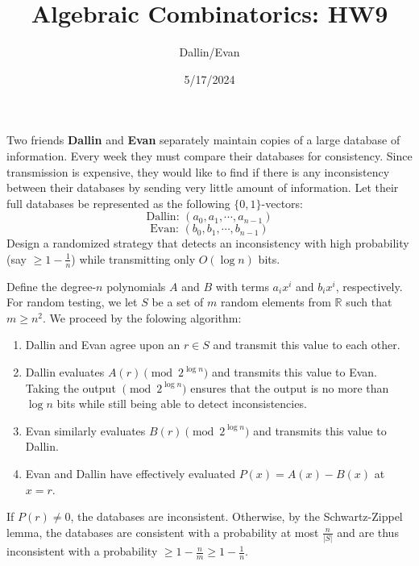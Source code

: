 \documentclass[11pt,letterpaper]{article}
\title{Algebraic Combinatorics: HW9}
\author{Dallin/Evan}
\date{5/17/2024}
\begin{document}
\maketitle
\begin{quest}[\textcolor{red}{Testing for Database consistency}] 
    Two friends \textbf{Dallin} and \textbf{Evan} separately maintain copies of a large database of information. Every week they must compare their databases for consistency. Since transmission is expensive, they would like to find if there is any inconsistency between their databases by sending very little amount of information. Let their full databases be represented as the following $\{0,1\}$-vectors: 
    \[\text{Dallin: } (a_0,a_1,\cdots, a_{n-1})\]
    \[\text{Evan: } (b_0,b_1,\cdots, b_{n-1})\]
    Design a randomized strategy that detects an inconsistency with high probability \big(say $\ge 1-\frac{1}{n}$\big) while transmitting only $O(\log n)$ bits.
\end{quest}
\begin{solution}
    Define the degree-$n$ polynomials $A$ and $B$ with terms $a_ix^i$ and $b_ix^i$, respectively. For random testing, we let $S$ be a set of $m$ random elements from $\mathbb{R}$ such that $m \geq n^2$. We proceed by the folowing algorithm:

    \begin{enumerate}
        \item Dallin and Evan agree upon an $r \in S$ and transmit this value to each other.
        \item Dallin evaluates $A(r) \pmod{2^{\log n}}$ and transmits this value to Evan. Taking the output $\pmod{2^{\log n}}$ ensures that the output is no more than $\log n$ bits while still being able to detect inconsistencies.
        \item Evan similarly evaluates $B(r)\pmod{2^{\log n}}$ and transmits this value to Dallin.
        \item Evan and Dallin have effectively evaluated $P(x)=A(x)-B(x)$ at $x=r$.
    \end{enumerate}
    If $P(r) \neq 0$, the databases are inconsistent. Otherwise, by the Schwartz-Zippel lemma, the databases are consistent with a probability at most $ \frac{n}{|S|}$ and are thus inconsistent with a probability $\ge 1 - \frac{n}{m}\geq 1-\frac{1}{n}$.
\end{solution}
\end{document}
